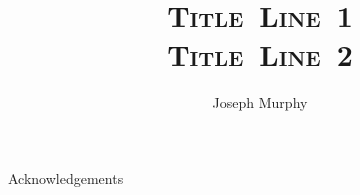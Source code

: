\documentclass[11pt]{mvlthesis}
\title{\scshape \mbox{Title Line 1}\\
\scshape \mbox{Title Line 2}}
\author{Joseph Murphy}
\begin{document}
\maketitle
\begin{abstract}



\end{abstract}

\begin{frontmatter}

\begin{acknowledgements}
\begin{center}
\vspace{0.4in}
Acknowledgements
\end{center}
\end{acknowledgements}

\tableofcontents
\listoffigures
\listoftables

\end{frontmatter}











\appendix
\end{document}
